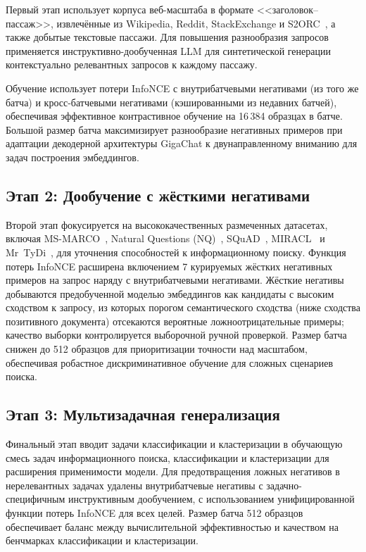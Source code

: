Первый этап использует корпуса веб-масштаба в формате <<заголовок--пассаж>>, извлечённые из Wikipedia, Reddit, StackExchange и S2ORC~\cite{lo2020s2orc}, а также добытые текстовые пассажи. Для повышения разнообразия запросов применяется инструктивно-дообученная LLM для синтетической генерации контекстуально релевантных запросов к каждому пассажу.

Обучение использует потери InfoNCE с внутрибатчевыми негативами (из того же батча) и кросс-батчевыми негативами (кэшированными из недавних батчей), обеспечивая эффективное контрастивное обучение на 16\,384 образцах в батче. Большой размер батча максимизирует разнообразие негативных примеров при адаптации декодерной архитектуры GigaChat к двунаправленному вниманию для задач построения эмбеддингов.

\subsection{Этап 2: Дообучение с жёсткими негативами}\label{subsec:ge_stage2}

Второй этап фокусируется на высококачественных размеченных датасетах, включая MS-MARCO~\cite{bajaj2018msmarco}, Natural Questions (NQ)~\cite{kwiatkowski2019nq}, SQuAD~\cite{rajpurkar2016squad}, MIRACL~\cite{zhang2023miracl} и Mr~TyDi~\cite{zhang2021mrtydi}, для уточнения способностей к информационному поиску. Функция потерь InfoNCE расширена включением 7 курируемых жёстких негативных примеров на запрос наряду с внутрибатчевыми негативами. Жёсткие негативы добываются предобученной моделью эмбеддингов как кандидаты с высоким сходством к запросу, из которых порогом семантического сходства (ниже сходства позитивного документа) отсекаются вероятные ложноотрицательные примеры; качество выборки контролируется выборочной ручной проверкой. Размер батча снижен до 512 образцов для приоритизации точности над масштабом, обеспечивая робастное дискриминативное обучение для сложных сценариев поиска.

\subsection{Этап 3: Мультизадачная генерализация}\label{subsec:ge_stage3}

Финальный этап вводит задачи классификации и кластеризации в обучающую смесь задач информационного поиска, классификации и кластеризации для расширения применимости модели. Для предотвращения ложных негативов в нерелевантных задачах удалены внутрибатчевые негативы с задачно-специфичным инструктивным дообучением, с использованием унифицированной функции потерь InfoNCE для всех целей. Размер батча 512 образцов обеспечивает баланс между вычислительной эффективностью и качеством на бенчмарках классификации и кластеризации.


